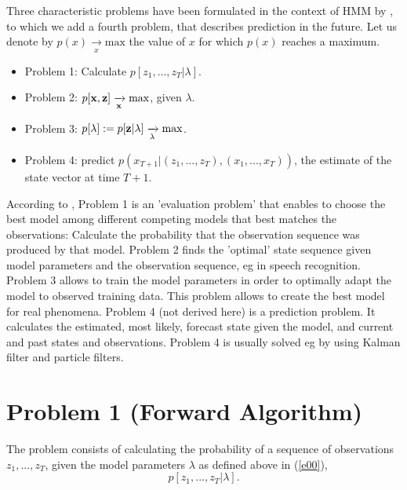 \documentclass{article}
\begin{document}
Three characteristic problems have been formulated in the context of HMM by \cite{rab89}, to which we add a fourth problem, that describes prediction in the future. Let us denote by $ p(x) \xrightarrow[x]{}  \text{max}$ the value of $x$ for which $p(x)$ reaches a maximum.
\begin{itemize}
\item Problem 1: Calculate $p[z_1,...,z_T|\lambda]$.
\item Problem 2: $p[{\bf{x}},{\bf{z}}] \xrightarrow[{\bf{x}}]{}  \text{max}$, given $\lambda$.
\item Problem 3: $p[\lambda] := p[{\bf{z}}|\lambda]  \xrightarrow[\lambda]{}  \text{max}$.
\item Problem 4: predict $p(x_{T+1}|(z_1,...,z_T),(x_1,...,x_T))$, \newline
the estimate of the state vector at time $T+1$. 
\end{itemize}

According to \cite{rab89}, Problem 1 is an 'evaluation problem' that enables to choose the best model among different competing models that best matches the observations: Calculate the probability that the observation sequence was produced by that model.
Problem 2 finds the 'optimal' state sequence given model parameters and the observation sequence, eg in speech recognition.
Problem 3 allows to train the model parameters in order to optimally adapt the model to observed training data. This problem allows to create the best model for real phenomena.
Problem 4 (not derived here) is a prediction problem. It calculates the estimated, most likely, forecast state given the model, and current and past states and observations. Problem 4 is usually solved eg by using Kalman filter and particle filters.


\section{Problem 1 (Forward Algorithm)}

The problem consists of calculating the probability of a sequence of observations $z_1,...,z_T$, given the model parameters $\lambda$ as defined above in (\ref{e00}),
\begin{equation}
p[z_1,...,z_T|\lambda].
\end{equation} 
\end{document}
